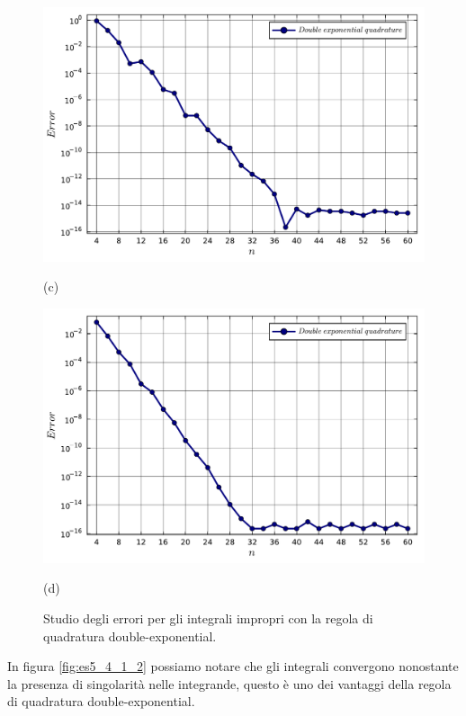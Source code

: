 \documentclass[letterpaper, 12pt]{article}
\begin{document}
\begin{figure}[!ht]
\begin{minipage}[b]{0.47\textwidth}
        \includegraphics[width=\textwidth]{5423.pdf}
        \caption*{(c)}
    \end{minipage}
    \begin{minipage}[b]{0.47\textwidth}
        \includegraphics[width=\textwidth]{5424.pdf}
        \caption*{(d)}
    \end{minipage}
    \caption{Studio degli errori per gli integrali impropri con la regola di quadratura double-exponential.}
    \label{fig:es5_4_2_1}
\end{figure}
In figura \ref{fig:es5_4_1_2} possiamo notare che gli integrali convergono nonostante la presenza di singolarità
nelle integrande, questo è uno dei vantaggi della regola di quadratura double-exponential. 
\end{document}
